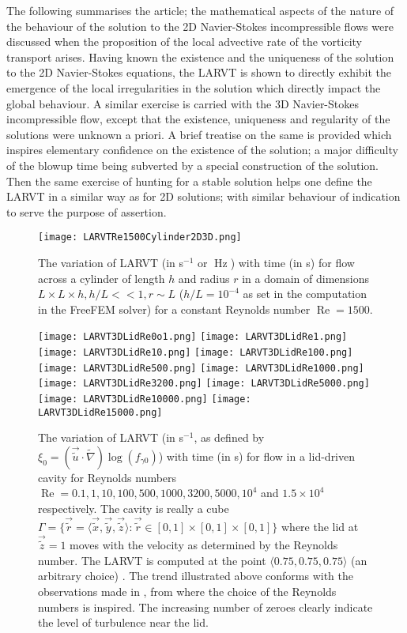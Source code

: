 \documentclass{article}
\begin{document}
The following summarises the article; the mathematical aspects of the nature of the behaviour of the solution to the 2D Navier-Stokes incompressible flows were discussed when the proposition of the local advective rate of the vorticity transport arises. Having known the existence and the uniqueness of the solution to the 2D Navier-Stokes equations, the LARVT is shown to directly exhibit the emergence of the local irregularities in the solution which directly impact the global behaviour. A similar exercise is carried with the 3D Navier-Stokes incompressible flow, except that the existence, uniqueness and regularity of the solutions were unknown a priori. A brief treatise on the same is provided which inspires elementary confidence on the existence of the solution; a major difficulty of the blowup time being subverted by a special construction of the solution. Then the same exercise of hunting for a stable solution helps one define the LARVT in a similar way as for 2D solutions; with similar behaviour of indication to serve the purpose of assertion.
\begin{figure}
\begin{center}
\texttt{[image: LARVTRe1500Cylinder2D3D.png]}
\caption{\label{Fig6} The variation of LARVT (in s$^{-1}$ or $\operatorname{Hz}$) with time (in s) for flow across a cylinder of length $h$ and radius $r$ in a domain of dimensions $L\times L\times h, h/L<<1, r \sim L$ ($h/L = 10^{-4}$ as set in the computation in the FreeFEM solver) for a constant Reynolds number $\operatorname{Re} = 1500$.}
\end{center}
\end{figure}
\begin{figure}
\texttt{[image: LARVT3DLidRe0o1.png]}
\texttt{[image: LARVT3DLidRe1.png]}
\texttt{[image: LARVT3DLidRe10.png]}
\texttt{[image: LARVT3DLidRe100.png]}
\texttt{[image: LARVT3DLidRe500.png]}
\texttt{[image: LARVT3DLidRe1000.png]}
\texttt{[image: LARVT3DLidRe3200.png]}
\texttt{[image: LARVT3DLidRe5000.png]}
\texttt{[image: LARVT3DLidRe10000.png]}
\texttt{[image: LARVT3DLidRe15000.png]}
\caption{\label{Fig7} The variation of LARVT (in s$^{-1}$, as defined by $\xi_0 = (\vec{\tilde{u}}\cdot\tilde{\nabla})\operatorname{log}(f_{\gamma 0})$) with time (in s) for flow in a lid-driven cavity for Reynolds numbers $\operatorname{Re} = 0.1, 1, 10, 100, 500, 1000, 3200, 5000, 10^4$ and $ 1.5\times10^4$ respectively. The cavity is really a cube $\Gamma = \{\vec{\tilde{r}} = \langle \vec{\tilde{x}}, \vec{\tilde{y}}, \vec{\tilde{z}} \rangle: \vec{\tilde{r}} \in [0, 1]\times[0, 1]\times[0, 1]\}$ where the lid at $\vec{\tilde{z}} = 1$ moves with the velocity as determined by the Reynolds number. The LARVT is computed at the point $\langle 0.75, 0.75, 0.75\rangle$ (an arbitrary choice) . The trend illustrated above conforms with the observations made in \cite{dsamantaray}, from where the choice of the Reynolds numbers is inspired. The increasing number of zeroes clearly indicate the level of turbulence near the lid.}
\end{figure}
\end{document}

